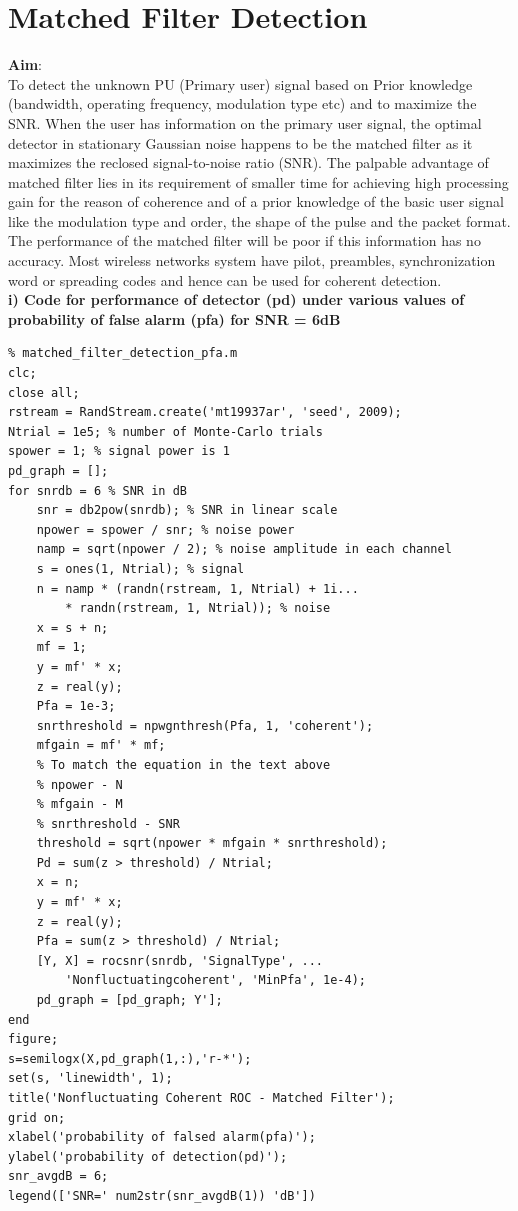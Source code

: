 \documentclass[a4paper]{article}
\begin{document}
\section{Matched Filter Detection}
\textbf{\large{Aim}}:\\[10pt]
To detect the unknown PU (Primary user) signal based on Prior knowledge
(bandwidth, operating frequency, modulation type etc) and to maximize the
SNR. When the user has information on the primary user signal, the optimal
detector in stationary Gaussian noise happens to be the matched filter as it
maximizes the reclosed signal-to-noise ratio (SNR). The palpable advantage
of matched filter lies in its requirement of smaller time for achieving high
processing gain for the reason of coherence and of a prior knowledge of the
basic user signal like the modulation type and order, the shape of the pulse
and the packet format. The performance of the matched filter will be poor if
this information has no accuracy. Most wireless networks system have pilot,
preambles, synchronization word or spreading codes and hence can be used
for coherent detection.\\[10pt]
\textbf{i) Code for performance of detector (pd) under various values of probability
of false alarm (pfa) for SNR = 6dB}\\
\begin{verbatim}
% matched_filter_detection_pfa.m
clc;
close all;
rstream = RandStream.create('mt19937ar', 'seed', 2009);
Ntrial = 1e5; % number of Monte-Carlo trials
spower = 1; % signal power is 1
pd_graph = [];
for snrdb = 6 % SNR in dB
    snr = db2pow(snrdb); % SNR in linear scale
    npower = spower / snr; % noise power
    namp = sqrt(npower / 2); % noise amplitude in each channel
    s = ones(1, Ntrial); % signal
    n = namp * (randn(rstream, 1, Ntrial) + 1i...
        * randn(rstream, 1, Ntrial)); % noise
    x = s + n;
    mf = 1;
    y = mf' * x;
    z = real(y);
    Pfa = 1e-3;
    snrthreshold = npwgnthresh(Pfa, 1, 'coherent');
    mfgain = mf' * mf;
    % To match the equation in the text above
    % npower - N
    % mfgain - M
    % snrthreshold - SNR
    threshold = sqrt(npower * mfgain * snrthreshold);
    Pd = sum(z > threshold) / Ntrial;
    x = n;
    y = mf' * x;
    z = real(y);
    Pfa = sum(z > threshold) / Ntrial;
    [Y, X] = rocsnr(snrdb, 'SignalType', ...
        'Nonfluctuatingcoherent', 'MinPfa', 1e-4);
    pd_graph = [pd_graph; Y'];
end
figure;
s=semilogx(X,pd_graph(1,:),'r-*');
set(s, 'linewidth', 1);
title('Nonfluctuating Coherent ROC - Matched Filter');
grid on;
xlabel('probability of falsed alarm(pfa)');
ylabel('probability of detection(pd)');
snr_avgdB = 6;
legend(['SNR=' num2str(snr_avgdB(1)) 'dB'])
\end{verbatim}
\end{document}

